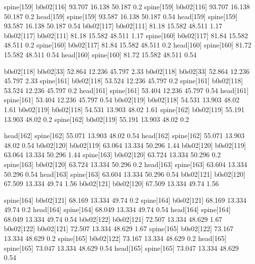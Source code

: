 spine[159]    b0s02[116]    93.707    16.138    50.187    0.2
spine[159]    b0s02[116]    93.707    16.138    50.187    0.2
head[159]    spine[159]    93.587    16.138    50.187    0.54
head[159]    spine[159]    93.587    16.138    50.187    0.54
b0s02[117]    b0s02[111]    81.18    15.582    48.511    1.17
b0s02[117]    b0s02[111]    81.18    15.582    48.511    1.17
spine[160]    b0s02[117]    81.84    15.582    48.511    0.2
spine[160]    b0s02[117]    81.84    15.582    48.511    0.2
head[160]    spine[160]    81.72    15.582    48.511    0.54
head[160]    spine[160]    81.72    15.582    48.511    0.54


b0s02[118]    b0s02[33]    52.864    12.236    45.797    2.33
b0s02[118]    b0s02[33]    52.864    12.236    45.797    2.33
spine[161]    b0s02[118]    53.524    12.236    45.797    0.2
spine[161]    b0s02[118]    53.524    12.236    45.797    0.2
head[161]    spine[161]    53.404    12.236    45.797    0.54
head[161]    spine[161]    53.404    12.236    45.797    0.54
b0s02[119]    b0s02[118]    54.531    13.903    48.02    1.61
b0s02[119]    b0s02[118]    54.531    13.903    48.02    1.61
spine[162]    b0s02[119]    55.191    13.903    48.02    0.2
spine[162]    b0s02[119]    55.191    13.903    48.02    0.2


head[162]    spine[162]    55.071    13.903    48.02    0.54
head[162]    spine[162]    55.071    13.903    48.02    0.54
b0s02[120]    b0s02[119]    63.064    13.334    50.296    1.44
b0s02[120]    b0s02[119]    63.064    13.334    50.296    1.44
spine[163]    b0s02[120]    63.724    13.334    50.296    0.2
spine[163]    b0s02[120]    63.724    13.334    50.296    0.2
head[163]    spine[163]    63.604    13.334    50.296    0.54
head[163]    spine[163]    63.604    13.334    50.296    0.54
b0s02[121]    b0s02[120]    67.509    13.334    49.74    1.56
b0s02[121]    b0s02[120]    67.509    13.334    49.74    1.56


spine[164]    b0s02[121]    68.169    13.334    49.74    0.2
spine[164]    b0s02[121]    68.169    13.334    49.74    0.2
head[164]    spine[164]    68.049    13.334    49.74    0.54
head[164]    spine[164]    68.049    13.334    49.74    0.54
b0s02[122]    b0s02[121]    72.507    13.334    48.629    1.67
b0s02[122]    b0s02[121]    72.507    13.334    48.629    1.67
spine[165]    b0s02[122]    73.167    13.334    48.629    0.2
spine[165]    b0s02[122]    73.167    13.334    48.629    0.2
head[165]    spine[165]    73.047    13.334    48.629    0.54
head[165]    spine[165]    73.047    13.334    48.629    0.54


